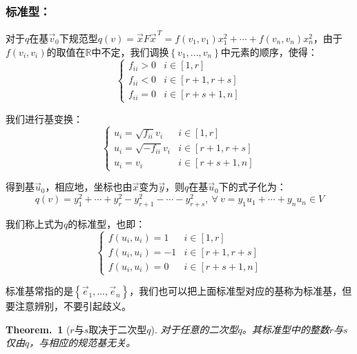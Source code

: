 \documentclass[zihao=5,UTF8]{report}
\theoremstyle{mystyle} %
\newtheorem{theorem}{Theorem.\,}
\begin{document}
\subsubsection{标准型：}
对于$q$在基$\vec{v}_0$下规范型$q(v) = \vec{x}
F \vec{x}^{\,T}
  =f(v_1,v_1)x_1^2 + \cdots +f(v_n,v_n)x_n^2 $，由于$f(v_i,v_i)$的取值在$\mathbb{R}$中不定，我们调换$\left\{v_1,...,v_n\right\}$中元素的顺序，使得：
\begin{equation*}
    \begin{cases}
       f_{ii}>0 &  i \in [1,r] \\
       f_{ii}<0 &  i \in [r+1,r+s]\\
       f_{ii}=0 &  i \in [r+s+1,n]
      \end{cases}
\end{equation*}\par
我们进行基变换：
\begin{equation*}
    \begin{cases}
        u_i = \sqrt{f_{ii}}v_i &  i \in [1,r] \\
        u_i = \sqrt{-f_{ii}}v_i &  i \in [r+1,r+s]\\
        u_i = v_i &  i \in [r+s+1,n]
       \end{cases}
\end{equation*}\par
得到基$\vec{u}_0$，相应地，坐标也由$\vec{x}$变为$\vec{y}$，则$q$在基$\vec{u}_0$下的式子化为：
\begin{equation*}
    q(v) = y_1^2 + \cdots + y_r^2-y_{r+1}^2- \cdots -y_{r+s}^2 ,\ \forall \ v = y_1u_1 + \cdots + y_nu_n \in V
\end{equation*}\par
我们称上式为$q$的标准型，也即：
\begin{equation*}
    \begin{cases}
        f(u_i,u_i) = 1 &  i \in [1,r] \\
        f(u_i,u_i) = -1 &  i \in [r+1,r+s]\\
        f(u_i,u_i) = 0 &  i \in [r+s+1,n]
    \end{cases}
\end{equation*}\par
{\color{gray}\small 标准基常指的是$\left\{\vec{e}_1,\dots , \vec{e}_n\right\}$，我们也可以把上面标准型对应的基称为标准基，但要注意辨别，不要引起歧义。}
\begin{theorem}[$r$与$s$取决于二次型$q$]
    对于任意的二次型$q$。其标准型中的整数$r$与$s$仅由$q$，与相应的规范基无关。
\end{theorem}
\end{document}

